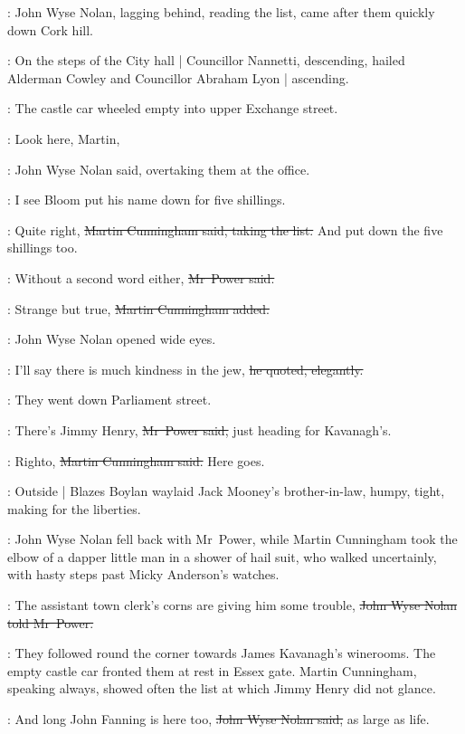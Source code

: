 :
John Wyse Nolan,
lagging behind, reading the list,
came after them
quickly down Cork hill.

:
On the steps of the City hall |
Councillor Nannetti, descending,
hailed Alderman Cowley and Councillor Abraham Lyon |
ascending.

:
The castle car wheeled empty into upper Exchange street.

\johnwyse:
Look here, Martin,

:
John Wyse Nolan said,
overtaking them at the  office.

\johnwyse:
I see Bloom put his name down for five shillings.

\cunningham:
Quite right,
\sout{Martin Cunningham said,
taking the list.}
And put down the
five shillings too.

\power:
Without a second word either,
\sout{Mr~Power said.}

\cunningham:
Strange but true,
\sout{Martin Cunningham added.}

:
John Wyse Nolan opened wide eyes.

\johnwyse:
I'll say there is much kindness in the jew,%
\sout{he quoted, elegantly.}

:
They went down Parliament street.

\power:
There's Jimmy Henry,
\sout{Mr~Power said,}
just heading for Kavanagh's.

\cunningham:
Righto,
\sout{Martin Cunningham said.}
Here goes.

\begin{interject}
    :
    Outside  |
    Blazes Boylan waylaid Jack Mooney's brother-in-law,
    humpy, tight,
    making for the liberties.
\end{interject}

:
John Wyse Nolan fell back with Mr~Power,
while Martin Cunningham took the elbow
of a dapper little man in a shower of hail suit,
who walked uncertainly,
with hasty steps past Micky Anderson's watches.

\johnwyse:
The assistant town clerk's corns are giving him some trouble,
\sout{John Wyse Nolan told Mr~Power.}%

:
They followed round the corner
towards James Kavanagh's winerooms.
The empty castle car fronted them at rest in Essex gate.
Martin Cunningham,
speaking always,
showed often the list at which Jimmy Henry did not glance.

\johnwyse:
And long John Fanning is here too,
\sout{John Wyse Nolan said,}
as large as life.

